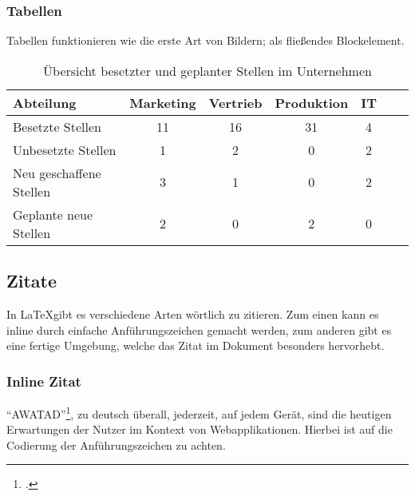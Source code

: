 \subsubsection{Tabellen}
  Tabellen funktionieren wie die erste Art von Bildern; als fließendes Blockelement.

  \begin{table}[bh]
    \centering
    \begin{tabular}{@{}lcccccc@{}}
    \toprule
    Abteilung               & Marketing & Vertrieb & Produktion & IT \\ \midrule
    Besetzte Stellen        & 11        & 16       & 31         & 4  \\
    Unbesetzte Stellen      & 1         & 2        & 0          & 2  \\
    Neu geschaffene Stellen & 3         & 1        & 0          & 2  \\
    Geplante neue Stellen   & 2         & 0        & 2          & 0  \\ \bottomrule
    \end{tabular}
    \caption{Übersicht besetzter und geplanter Stellen im Unternehmen}
    \label{tbl_proglang}
  \end{table}

\subsection{Zitate}
  In \LaTeX gibt es verschiedene Arten wörtlich zu zitieren.
  Zum einen kann es inline durch einfache Anführungszeichen gemacht werden, 
  zum anderen gibt es eine fertige Umgebung, welche das Zitat im Dokument besonders hervorhebt.
  
  \subsubsection{Inline Zitat}
    "`\gls{AWATAD}"'\footcite[S. 2703]{timmerer2019journey}, zu deutsch überall, jederzeit, auf jedem Gerät,
    sind die heutigen Erwartungen der Nutzer im Kontext von Webapplikationen.
    Hierbei ist auf die Codierung der Anführungszeichen zu achten.
  
